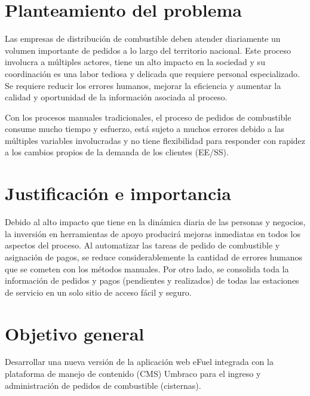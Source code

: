 \section*{Planteamiento del problema}
Las empresas de distribución de combustible deben atender diariamente un volumen importante de pedidos a lo largo del territorio nacional. Este proceso involucra a múltiples actores, tiene un alto impacto en la sociedad y su coordinación es una labor tediosa y delicada que requiere personal especializado. Se requiere reducir los errores humanos, mejorar la eficiencia y aumentar la calidad y oportunidad de la información asociada al proceso.

Con los procesos manuales tradicionales, el proceso de pedidos de combustible consume mucho tiempo y esfuerzo, está sujeto a muchos errores debido a las múltiples variables involucradas y no tiene flexibilidad para responder con rapidez a los cambios propios de la demanda de los clientes (EE/SS).

\section*{Justificación e importancia}
Debido al alto impacto que tiene en la dinámica diaria de las personas y negocios, la inversión en herramientas de apoyo producirá mejoras inmediatas en todos los aspectos del proceso. Al automatizar las tareas de pedido de combustible y asignación de pagos, se reduce considerablemente la cantidad de errores humanos que se cometen con los métodos manuales. Por otro lado, se consolida toda la información de pedidos y pagos (pendientes y realizados) de todas las estaciones de servicio en un solo sitio de acceso fácil y seguro.

\section*{Objetivo general}
Desarrollar una nueva versión de la aplicación web eFuel integrada con la plataforma de manejo de contenido (CMS) Umbraco para el ingreso y administración de pedidos de combustible (cisternas).

